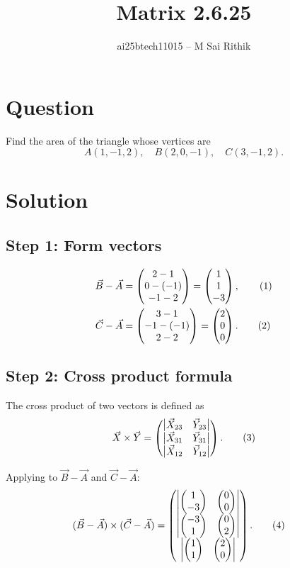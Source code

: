 \documentclass[12pt]{article}
\title{Matrix 2.6.25}
\author{ai25btech11015 -- M Sai Rithik}
\date{}
\begin{document}
\maketitle

\section*{Question}
Find the area of the triangle whose vertices are 
\[
A(1,-1,2), \quad B(2,0,-1), \quad C(3,-1,2).
\]

\section*{Solution}

\subsection*{Step 1: Form vectors}
\begin{align}
\Vec{B}-\Vec{A} &= \begin{pmatrix}2-1 \\ 0-(-1) \\ -1-2\end{pmatrix} = \begin{pmatrix}1 \\ 1 \\ -3\end{pmatrix}, \tag{1}\\
\Vec{C}-\Vec{A} &= \begin{pmatrix}3-1 \\ -1-(-1) \\ 2-2\end{pmatrix} = \begin{pmatrix}2 \\ 0 \\ 0\end{pmatrix}. \tag{2}
\end{align}

\subsection*{Step 2: Cross product formula}
The cross product of two vectors is defined as
\begin{align}
\Vec{X}\times\Vec{Y} =
\begin{pmatrix}
  \begin{vmatrix}\Vec{X}_{23} & \Vec{Y}_{23}\end{vmatrix} \\
  \begin{vmatrix}\Vec{X}_{31} & \Vec{Y}_{31}\end{vmatrix} \\
  \begin{vmatrix}\Vec{X}_{12} & \Vec{Y}_{12}\end{vmatrix}
\end{pmatrix}. \tag{3}
\end{align}

Applying to $\Vec{B}-\Vec{A}$ and $\Vec{C}-\Vec{A}$:
\begin{align}
(\Vec{B}-\Vec{A})\times(\Vec{C}-\Vec{A})
&= 
\begin{pmatrix}
\begin{vmatrix}\begin{pmatrix}1 \\ -3\end{pmatrix} & \begin{pmatrix}0 \\ 0\end{pmatrix}\end{vmatrix} \\
\begin{vmatrix}\begin{pmatrix}-3 \\ 1\end{pmatrix} & \begin{pmatrix}0 \\ 2\end{pmatrix}\end{vmatrix} \\
\begin{vmatrix}\begin{pmatrix}1 \\ 1\end{pmatrix} & \begin{pmatrix}2 \\ 0\end{pmatrix}\end{vmatrix}
\end{pmatrix}. \tag{4}
\end{align}
\end{document}
